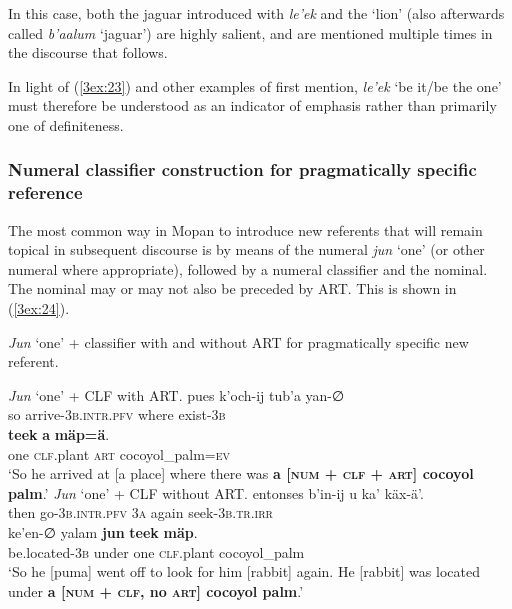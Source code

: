 \documentclass[output=paper]{langsci/langscibook}
\begin{document}
In this case, both the jaguar introduced with {\emph{le'ek}} and the `lion' (also afterwards called {\emph{b'aalum}} `jaguar') are highly salient, and are mentioned multiple times in the discourse that follows. 

In light of (\ref{3ex:23}) and other examples of first mention, {\emph{le'ek}} `be it/be the one' must therefore be understood as an indicator of emphasis rather than primarily one of definiteness.


\subsubsection{Numeral classifier construction for pragmatically specific reference}\label{3sec:334}

The most common way in Mopan to introduce new referents that will remain topical in subsequent discourse is by means of the numeral {\emph{jun}} `one' (or other numeral where appropriate), followed by a numeral classifier and the nominal.  The nominal may or may not also be preceded by ART.  This is shown in (\ref{3ex:24}).


\begin{exe}
\ex\label{3ex:24}
{\emph{Jun}} `one' + classifier with and without ART for pragmatically specific new referent.
	\begin{xlista}
	\ex\label{3ex:24a}
	{\emph{Jun}} `one' + CLF with ART.  
	\exi{}
	\gll	pues	k'och-ij				tub'a		yan-∅ \\
		so	arrive-{\textsc{3b.intr.pfv}}	where	exist-{\textsc{3b}} \\
	\glt
	\exi{}
		{\textbf{teek}}		{\textbf{a}}	{\textbf{m\"ap=\"a}}. \\
		one		{\textsc{clf}}.plant	{\textsc{art}}		cocoyol\_palm={\textsc{ev}} \\
	\glt	`So he arrived at [a place] where there was {\textbf{a [{\textsc{num}} + {\textsc{clf}} + {\textsc{art}}] cocoyol palm}}.'
	\ex\label{3ex:24b}
	{\emph{Jun}} `one' + CLF without ART. 
	\exi{}
	\gll	entonses		b'in-ij				u		ka'		k\"ax-\"a'. \\
		then			go-{\textsc{3b.intr.pfv}}	{\textsc{3a}}	again	seek-{\textsc{3b.tr.irr}} \\
	\glt
	\exi{}	
	\gll	ke'en-{∅}			yalam	{\textbf{jun}}	{\textbf{teek}}		{\textbf{m\"ap}}.  \\
		be.located-{\textsc{3b}}	under	one		{\textsc{clf}}.plant	cocoyol\_palm \\
	\glt	`So he [puma] went off to look for him [rabbit] again. He [rabbit] was located under {\textbf{a [{\textsc{num}} + {\textsc{clf}}, no {\textsc{art}}] cocoyol palm}}.'
	\end{xlista}
\end{exe}
\end{document}
